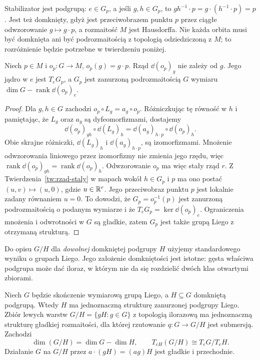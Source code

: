Stabilizator jest podgrupą: $e\in G_p$, a jeśli $g,h\in G_p$, to
$gh^{-1}\cdot p=g\cdot(h^{-1}\cdot p)=p$. Jest też domknięty,
gdyż jest przeciwobrazem punktu $p$ przez ciągłe odwzorowanie
$g\mapsto g\cdot p$, a rozmaitość $M$ jest Hausdorffa. Nie każda
orbita musi być domknięta ani być podrozmaitością z topologią
odziedziczoną z $M$; to rozróżnienie będzie potrzebne w twierdzeniu
poniżej.

\begin{lemat}
\label{lem:klein-rzad-orbity}
Niech $p\in M$ i $o_p:G\to M$, $o_p(g)=g\cdot p$. Rząd
$\dd(o_p)_g$ nie zależy od $g$. Jego jądro w $e$ jest
$T_eG_p$, a $G_p$ jest zanurzoną podrozmaitością $G$ wymiaru
$\dim G-\operatorname{rank}\dd(o_p)_e$.
\end{lemat}
\begin{proof}
Dla $g,h\in G$ zachodzi $o_p\circ L_g=a_g\circ o_p$.
Różniczkując tę równość w $h$ i pamiętając, że $L_g$ oraz
$a_g$ są dyfeomorfizmami, dostajemy
\[
 \dd(o_p)_{gh}\circ\dd(L_g)_h
 =\dd(a_g)_{h\cdot p}\circ\dd(o_p)_h.
\]
Obie skrajne różniczki, $\dd(L_g)_h$ i $\dd(a_g)_{h\cdot p}$,
są izomorfizmami. Mnożenie odwzorowania liniowego przez
izomorfizmy nie zmienia jego rzędu, więc
$\operatorname{rank}\dd(o_p)_{gh}
=\operatorname{rank}\dd(o_p)_h$.
Odwzorowanie $o_p$ ma więc stały rząd $r$. Z
Twierdzenia~\ref{tw:rzad-staly} w mapach wokół $h\in G_p$ i $p$
ma ono postać $(u,v)\mapsto(u,0)$, gdzie $u\in\mathbb{R}^r$.
Jego przeciwobraz punktu $p$ jest lokalnie zadany równaniem $u=0$.
To dowodzi, że $G_p=o_p^{-1}(p)$ jest zanurzoną podrozmaitością
o podanym wymiarze i że $T_eG_p=\ker\dd(o_p)_e$.
Ograniczenia mnożenia i odwrotności w $G$ są gładkie, zatem
$G_p$ jest także grupą Liego z otrzymaną strukturą.
\end{proof}

Do opisu $G/H$ dla \emph{dowolnej} domkniętej podgrupy $H$ użyjemy
standardowego wyniku o grupach Liego. Jego założenie domkniętości
jest istotne: gęsta właściwa podgrupa może dać iloraz, w którym
nie da się rozdzielić dwóch klas otwartymi zbiorami.

\begin{twierdzenie}
\label{thm:klein-iloraz-liego}
Niech $G$ będzie skończenie wymiarową grupą Liego, a $H\subseteq G$
domkniętą podgrupą. Wtedy $H$ ma jednoznaczną strukturę zanurzonej
podgrupy Liego. Zbiór lewych warstw $G/H=\{gH:g\in G\}$ z topologią
ilorazową ma jednoznaczną strukturę gładkiej rozmaitości, dla której
rzutowanie $q:G\to G/H$ jest submersją. Zachodzi
\[
 \dim(G/H)=\dim G-\dim H,\qquad
 T_{eH}(G/H)\cong T_eG/T_eH.
\]
Działanie $G$ na $G/H$ przez $a\cdot(gH)=(ag)H$ jest gładkie
i przechodnie.
\end{twierdzenie}


